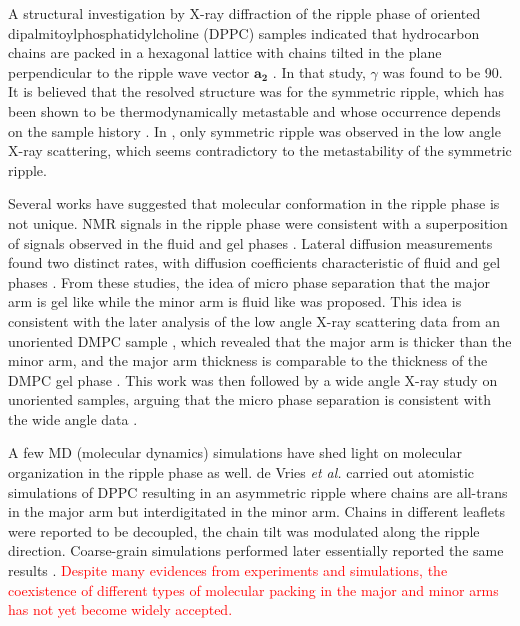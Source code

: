 A structural investigation by X-ray diffraction of the ripple phase of
oriented dipalmitoylphosphatidylcholine (\gls{DPPC}) samples indicated that
hydrocarbon chains are packed in a hexagonal lattice with chains
tilted in the plane perpendicular to the ripple wave vector $\mathbf{a_2}$ \cite{ref:Hentschel91}.
In that study, $\gamma$ was found to be 90\textdegree.
It is believed that the resolved structure was for the symmetric ripple,
which has been shown to be thermodynamically metastable and whose occurrence
depends on the sample history \cite{ref:Katsaras00}. 
In \cite{ref:Hentschel91}, only symmetric ripple was observed in the low angle
X-ray scattering, which seems contradictory to the metastability of the
symmetric ripple.

Several works have suggested that molecular conformation in the ripple phase is not 
unique. NMR signals in the ripple phase were consistent
with a superposition of signals observed in the fluid and gel phases
\cite{ref:Wittebort81}.
Lateral diffusion measurements found two distinct rates,
with diffusion coefficients characteristic of fluid and gel phases
\cite{ref:Schneider83}. 
From these studies, the idea of micro phase separation that the major arm
is gel like while the minor arm is fluid like was proposed.
This idea is consistent with the later analysis \cite{ref:Sun96} 
of the low angle X-ray scattering 
data from an unoriented DMPC sample \cite{ref:Wack89}, which revealed that 
the major arm is thicker than the minor arm, and 
the major arm thickness is comparable to the thickness of the DMPC gel phase
\cite{ref:Sun96}.
This work was then followed by a wide angle X-ray study on
unoriented samples, arguing that the micro phase separation is consistent 
with the wide angle data \cite{ref:Cunningham98}.

A few MD (molecular dynamics) simulations have shed light on molecular 
organization in the ripple phase as well. 
de Vries \textit{et al.} \cite{ref:deVries05}
carried out atomistic simulations of DPPC resulting in an
asymmetric ripple where chains are all-trans in the major arm but
interdigitated in the minor arm. Chains in different leaflets
were reported to be decoupled, the chain tilt was modulated 
along the ripple direction.
Coarse-grain simulations performed later essentially reported the same results
\cite{ref:Lenz07}.
\textcolor{red}{Despite many evidences from experiments and simulations, 
the coexistence of different types of molecular packing in the major and minor arms 
has not yet become widely accepted.}

